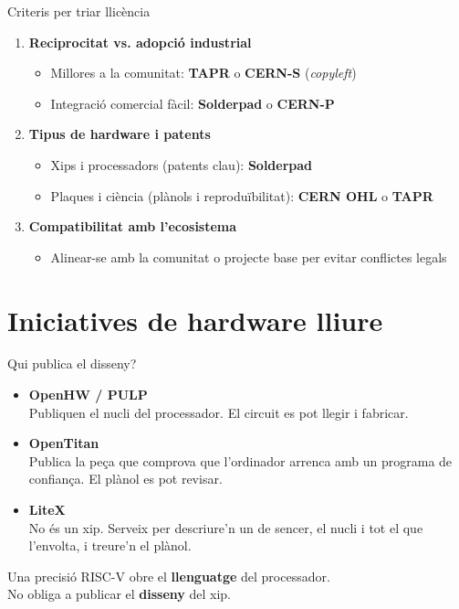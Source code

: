 \documentclass[catalan]{beamer}
\begin{document}
\begin{frame}{Criteris per triar llicència}
  \begin{enumerate}
    \item \textbf{Reciprocitat vs. adopció industrial}
      \begin{itemize}
        \item Millores a la comunitat: \textbf{TAPR} o \textbf{CERN-S} (\textit{copyleft})
        \item Integració comercial fàcil: \textbf{Solderpad} o \textbf{CERN-P}
      \end{itemize}
    \pause
    \vspace{0.2cm}
    \item \textbf{Tipus de hardware i patents}
      \begin{itemize}
        \item Xips i processadors (patents clau): \textbf{Solderpad}
        \item Plaques i ciència (plànols i reproduïbilitat): \textbf{CERN OHL} o \textbf{TAPR}
      \end{itemize}
    \pause
    \vspace{0.2cm}
    \item \textbf{Compatibilitat amb l'ecosistema}
      \begin{itemize}
        \item Alinear-se amb la comunitat o projecte base per evitar conflictes legals
      \end{itemize}
  \end{enumerate}
\end{frame}

\section{Iniciatives de hardware lliure}

\begin{frame}{Qui publica el disseny?}
  \begin{itemize}
    \item \textbf{OpenHW / PULP}\\
      Publiquen el nucli del processador. El circuit es pot llegir i fabricar.
    \item \textbf{OpenTitan}\\
      Publica la peça que comprova que l'ordinador arrenca amb un programa de confiança. El plànol es pot revisar.
    \item \textbf{LiteX}\\
      No és un xip. Serveix per descriure'n un de sencer, el nucli i tot el que l'envolta, i treure'n el plànol.
  \end{itemize}
  \vspace{0.25cm}
  \begin{alertblock}{Una precisió}
    RISC-V obre el \textbf{llenguatge} del processador.\\
    No obliga a publicar el \textbf{disseny} del xip.
  \end{alertblock}
\end{frame}
\end{document}
